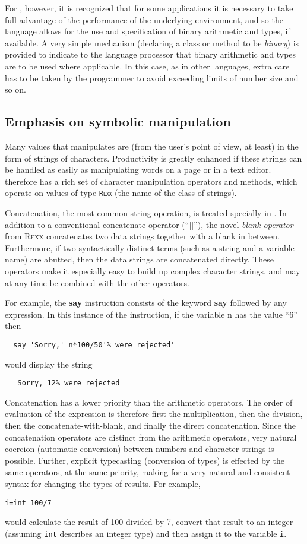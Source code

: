 For \nr{}, however, it is recognized that for some applications it
is necessary to take full advantage of the performance of the
underlying environment, and so the language allows for the use and
specification of binary arithmetic and types, if available. A very
simple mechanism (declaring a class or method to be \emph{binary}) is
provided to indicate to the language processor that binary arithmetic
and types are to be used where applicable. In this case, as in other
languages, extra care has to be taken by the programmer to avoid
exceeding limits of number size and so on.
\subsection{Emphasis on symbolic manipulation}
Many values that \nr{} manipulates are (from the user’s point of view, at least) in the form of strings of characters. Productivity is greatly enhanced if these strings can be handled as easily as manipulating words on a page or in a text editor. \nr{} therefore has a rich set of character manipulation operators and methods, which operate on values of type \texttt{R\textsc{exx}} (the name of the class of \nr{} strings).

Concatenation, the most common string operation, is treated specially
in \nr{}. In addition to a conventional concatenate operator (“||”),
the novel \emph{blank operator} from R\textsc{exx} concatenates two data
strings together with a blank in between. Furthermore, if two
syntactically distinct terms (such as a string and a variable name)
are abutted, then the data strings are concatenated directly. These
operators make it especially easy to build up complex character
strings, and may at any time be combined with the other operators.

For example, the \textbf{say} instruction consists of the keyword \textbf{say} followed
by any expression. In this instance of the instruction, if the
variable n has the value “6” then
 \begin{lstlisting}
  say 'Sorry,' n*100/50'% were rejected'
  \end{lstlisting}
would display the string
 \begin{lstlisting}
   Sorry, 12% were rejected
   \end{lstlisting}

Concatenation has a lower priority than the arithmetic operators. The order of evaluation of the expression is therefore first the multiplication, then the division, then the concatenate-with-blank, and finally the direct concatenation.
Since the concatenation operators are distinct from the arithmetic
operators, very natural coercion (automatic conversion) between
numbers and character strings is possible. Further, explicit typecasting (conversion of types) is effected by the same operators, at
the same priority, making for a very natural and consistent syntax for
changing the types of results. For example,
\begin{lstlisting}
i=int 100/7
\end{lstlisting}
would calculate the result of 100 divided by 7, convert that result to
an integer (assuming \texttt{int} describes an integer type) and then
assign it to the variable \texttt{i}.
